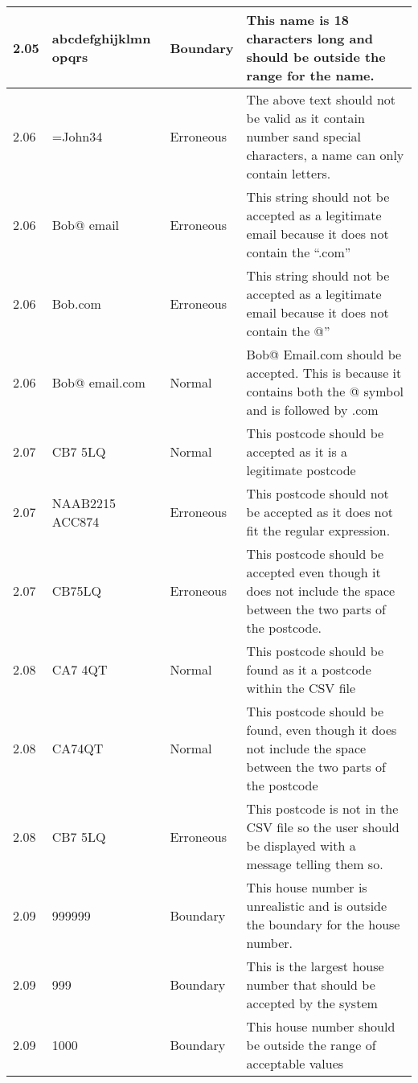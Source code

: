 \begin{flushleft}
\begin{longtable}{|p{1.5cm}|p{2.5cm}|p{2cm}|p{4.5cm}|}
	\rowcolor{light-grey}2.05 &  abcdefghijklmn opqrs& Boundary & This name is 18 characters long and should be outside the range for the name.\\ \hline
	\rowcolor{dark-grey}2.06 &  =John34 & Erroneous & The above text should not be valid as it contain number sand special characters, a name can only contain letters. \\ \hline
	2.06 &   Bob@ email  & Erroneous & This string should not be accepted as a legitimate email because it does not contain the ``.com'' \\ \hline
	2.06 &  Bob.com & Erroneous &  This string should not be accepted as a legitimate email because it does not contain the @'' \\ \hline
	2.06 &  Bob@ email.com & Normal &  Bob@ Email.com should be accepted. This is because it contains both the @ symbol and is followed by .com \\ \hline
	\rowcolor{light-grey}2.07 & CB7 5LQ  & Normal &This postcode should be accepted as it is a legitimate postcode \\ \hline
	\rowcolor{light-grey}2.07 & NAAB2215 ACC874  & Erroneous &This postcode should not be accepted as it does not fit the regular expression. \\ \hline
	\rowcolor{light-grey}2.07 & CB75LQ  & Erroneous &This postcode should be accepted even though it does not include the space between the two parts of the postcode. \\ \hline
	\rowcolor{light-grey}2.08 & CA7 4QT  & Normal & This postcode should be found as it a postcode within the CSV file \\ \hline
	\rowcolor{light-grey}2.08 & CA74QT  & Normal & This postcode should be found, even though it does not include the space between the two parts of the postcode \\ \hline
	\rowcolor{light-grey}2.08 & CB7 5LQ  & Erroneous & This postcode is not in the CSV file so the user should be displayed with a message telling them so. \\ \hline
	\rowcolor{light-grey}2.09 & 999999  & Boundary & This house number is unrealistic and is outside the boundary for the house number. \\ \hline
	\rowcolor{light-grey}2.09 & 999  & Boundary & This is the largest house number that should be accepted by the system \\ \hline
	\rowcolor{light-grey}2.09 & 1000  & Boundary & This house number should be outside the range of acceptable values  \\ \hline

\end{longtable}
\end{flushleft}
